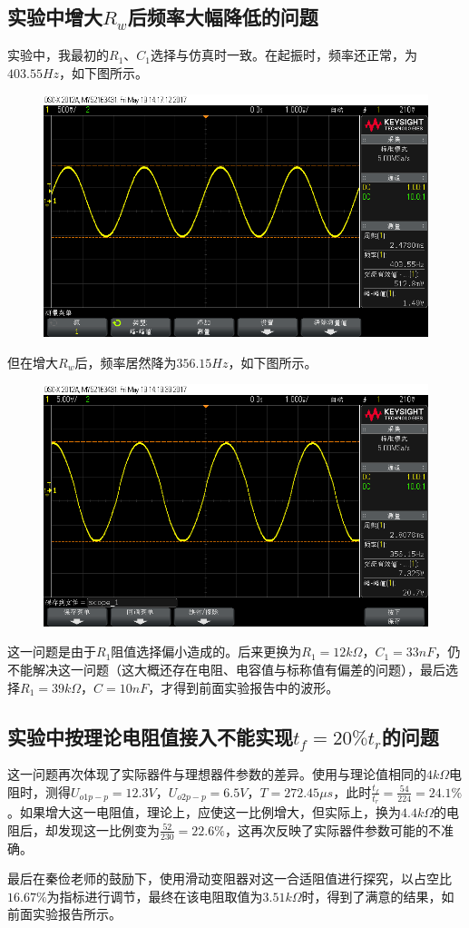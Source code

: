 \documentclass[12pt,a4paper]{article}
\begin{document}
\begin{spacing}{1.3}
\subsection{实验中增大$R_w$后频率大幅降低的问题}
实验中，我最初的$R_1、C_1$选择与仿真时一致。在起振时，频率还正常，为$403.55Hz$，如下图所示。
\begin{figure}[H]
\centering
\includegraphics[width=\textwidth]{scope_1-.png}
\end{figure}
但在增大$R_w$后，频率居然降为$356.15Hz$，如下图所示。
\begin{figure}[H]
\centering
\includegraphics[width=\textwidth]{scope_2-.png}
\end{figure}
这一问题是由于$R_1$阻值选择偏小造成的。后来更换为$R_1=12k\Omega，C_1=33nF$，仍不能解决这一问题（这大概还存在电阻、电容值与标称值有偏差的问题），最后选择$R_1=39k\Omega，C=10nF$，才得到前面实验报告中的波形。
\subsection{实验中按理论电阻值接入不能实现$t_f=20\% t_r$的问题}
这一问题再次体现了实际器件与理想器件参数的差异。使用与理论值相同的$4k\Omega$电阻时，测得$U_{o1p-p} = 12.3V，U_{o2p-p} = 6.5V，T=272.45\mu s$，此时$\frac{t_f}{t_r} = \frac{54}{224}=24.1\%$。如果增大这一电阻值，理论上，应使这一比例增大，但实际上，换为$4.4k\Omega$的电阻后，却发现这一比例变为$\frac{52}{230}=22.6\%$，这再次反映了实际器件参数可能的不准确。\par
最后在秦俭老师的鼓励下，使用滑动变阻器对这一合适阻值进行探究，以占空比$16.67\%$为指标进行调节，最终在该电阻取值为$3.51k\Omega$时，得到了满意的结果，如前面实验报告所示。

\end{spacing}
\end{document}
